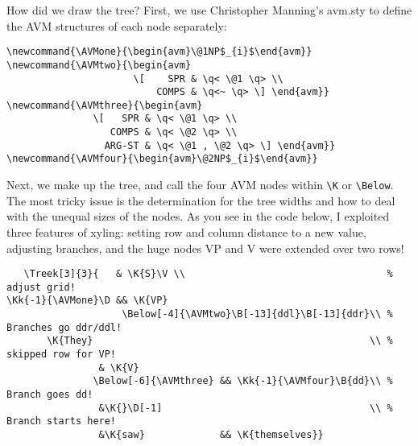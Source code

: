 \documentclass[12pt,a4paper]{article}
\begin{document}

How did we draw the tree? First, we use Christopher Manning's avm.sty to define the AVM
structures of each node separately:

\begin{verbatim}
\newcommand{\AVMone}{\begin{avm}\@1NP$_{i}$\end{avm}}
\newcommand{\AVMtwo}{\begin{avm}
                      \[    SPR & \q< \@1 \q> \\
                          COMPS & \q<~ \q> \] \end{avm}}
\newcommand{\AVMthree}{\begin{avm}
               \[   SPR & \q< \@1 \q> \\
                  COMPS & \q< \@2 \q> \\
                 ARG-ST & \q< \@1 , \@2 \q> \] \end{avm}}
\newcommand{\AVMfour}{\begin{avm}\@2NP$_{i}$\end{avm}}
\end{verbatim}

Next, we make up the tree, and call the four AVM nodes within \verb|\K| or
\verb|\Below|. The most tricky issue is the determination for the tree widths and how to
deal with the unequal sizes of the nodes. As you see in the code below, I exploited
three features of xyling: setting row and column distance to a new value, adjusting
branches, and the huge nodes VP and V were extended over two rows!

\footnotesize
\begin{verbatim}
   \Treek[3]{3}{   & \K{S}\V \\                                   % adjust grid!
\Kk{-1}{\AVMone}\D && \K{VP}
                    \Below[-4]{\AVMtwo}\B[-13]{ddl}\B[-13]{ddr}\\ % Branches go ddr/ddl!
       \K{They}                                                \\ % skipped row for VP!
                & \K{V}
               \Below[-6]{\AVMthree} && \Kk{-1}{\AVMfour}\B{dd}\\ % Branch goes dd!
                &\K{}\D[-1]                                    \\ % Branch starts here!
                &\K{saw}             && \K{themselves}}

\end{verbatim}
\normalsize
\end{document}
